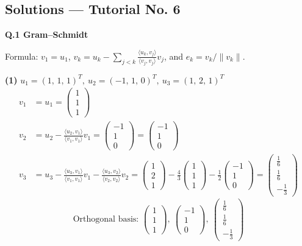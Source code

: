 \subsection*{Solutions --- Tutorial No. 6}
\medskip\noindent\textbf{Q.1  Gram--Schmidt}\par\smallskip
Formula: $v_1=u_1$, $v_k=u_k-\sum_{j<k}\frac{\langle u_k,v_j\rangle}{\langle v_j,v_j\rangle}v_j$, and $e_k=v_k/\|v_k\|$.

\noindent\textbf{(1)} $u_1=(1,\,1,\,1)^T,\ u_2=(-1,\,1,\,0)^T,\ u_3=(1,\,2,\,1)^T$
\begin{align*}
v_1&=u_1=\begin{pmatrix}1 \\ 1 \\ 1\end{pmatrix} \\
v_2&=u_2-\frac{\langle u_2,v_1\rangle}{\langle v_1,v_1\rangle}v_1=\begin{pmatrix}-1 \\ 1 \\ 0\end{pmatrix}=\begin{pmatrix}-1 \\ 1 \\ 0\end{pmatrix} \\
v_3&=u_3-\frac{\langle u_3,v_1\rangle}{\langle v_1,v_1\rangle}v_1-\frac{\langle u_3,v_2\rangle}{\langle v_2,v_2\rangle}v_2=\begin{pmatrix}1 \\ 2 \\ 1\end{pmatrix}-\frac{4}{3}\begin{pmatrix}1 \\ 1 \\ 1\end{pmatrix} -\frac{1}{2}\begin{pmatrix}-1 \\ 1 \\ 0\end{pmatrix}=\begin{pmatrix}\frac{1}{6} \\ \frac{1}{6} \\ - \frac{1}{3}\end{pmatrix}
\end{align*}
\[ \text{Orthogonal basis: }\begin{pmatrix}1 \\ 1 \\ 1\end{pmatrix},\ \begin{pmatrix}-1 \\ 1 \\ 0\end{pmatrix},\ \begin{pmatrix}\frac{1}{6} \\ \frac{1}{6} \\ - \frac{1}{3}\end{pmatrix} \]
